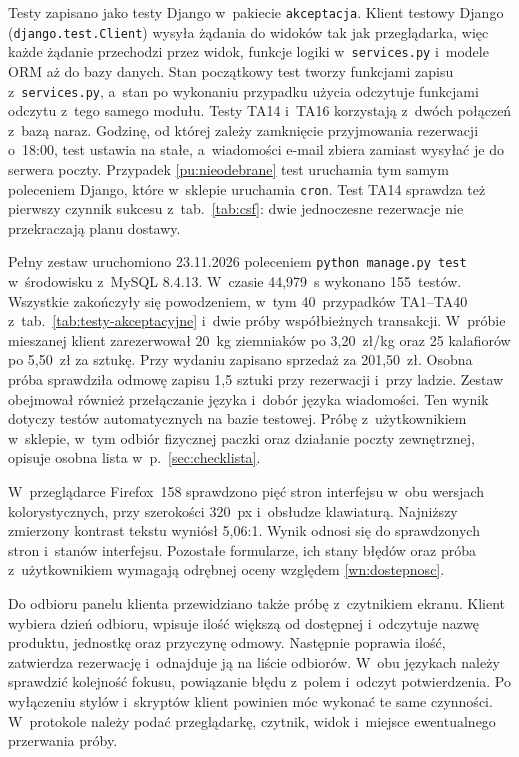 \documentclass[12pt,a4paper,oneside]{article}
\newcounter{pu}
\begin{document}
Testy zapisano jako testy Django w~pakiecie \texttt{akceptacja}. Klient testowy Django (\texttt{django.test.Client}) wysyła żądania do widoków tak jak przeglądarka, więc każde żądanie przechodzi przez widok, funkcje logiki w~\texttt{services.py} i~modele ORM aż do bazy danych. Stan początkowy test tworzy funkcjami zapisu z~\texttt{services.py}, a~stan po wykonaniu przypadku użycia odczytuje funkcjami odczytu z~tego samego modułu. Testy TA14 i~TA16 korzystają z~dwóch połączeń z~bazą naraz. Godzinę, od której zależy zamknięcie przyjmowania rezerwacji o~18:00, test ustawia na stałe, a~wiadomości e-mail zbiera zamiast wysyłać je do serwera poczty. Przypadek \ref{pu:nieodebrane} test uruchamia tym samym poleceniem Django, które w~sklepie uruchamia \texttt{cron}. Test TA14 sprawdza też pierwszy czynnik sukcesu z~tab.~\ref{tab:csf}: dwie jednoczesne rezerwacje nie przekraczają planu dostawy.

Pełny zestaw uruchomiono 23.11.2026 poleceniem \texttt{python manage.py test} w~środowisku z~MySQL 8.4.13. W~czasie 44,979~s wykonano 155~testów. Wszystkie zakończyły się powodzeniem, w~tym 40~przypadków TA1--TA40 z~tab.~\ref{tab:testy-akceptacyjne} i~dwie próby współbieżnych transakcji. W~próbie mieszanej klient zarezerwował 20~kg ziemniaków po 3,20~zł/kg oraz 25 kalafiorów po 5,50~zł za sztukę. Przy wydaniu zapisano sprzedaż za 201,50~zł. Osobna próba sprawdziła odmowę zapisu 1,5 sztuki przy rezerwacji i~przy ladzie. Zestaw obejmował również przełączanie języka i~dobór języka wiadomości. Ten wynik dotyczy testów automatycznych na bazie testowej. Próbę z~użytkownikiem w~sklepie, w~tym odbiór fizycznej paczki oraz działanie poczty zewnętrznej, opisuje osobna lista w~p.~\ref{sec:checklista}.

W~przeglądarce Firefox~158 sprawdzono pięć stron interfejsu w~obu wersjach kolorystycznych, przy szerokości 320~px i~obsłudze klawiaturą. Najniższy zmierzony kontrast tekstu wyniósł 5,06:1. Wynik odnosi się do sprawdzonych stron i~stanów interfejsu. Pozostałe formularze, ich stany błędów oraz próba z~użytkownikiem wymagają odrębnej oceny względem \ref{wn:dostepnosc}.

Do odbioru panelu klienta przewidziano także próbę z~czytnikiem ekranu. Klient wybiera dzień odbioru, wpisuje ilość większą od dostępnej i~odczytuje nazwę produktu, jednostkę oraz przyczynę odmowy. Następnie poprawia ilość, zatwierdza rezerwację i~odnajduje ją na liście odbiorów. W~obu językach należy sprawdzić kolejność fokusu, powiązanie błędu z~polem i~odczyt potwierdzenia. Po wyłączeniu stylów i~skryptów klient powinien móc wykonać te same czynności. W~protokole należy podać przeglądarkę, czytnik, widok i~miejsce ewentualnego przerwania próby.
\end{document}
